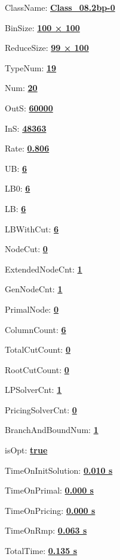 \documentclass[11pt]{article}
\begin{document}
\pagestyle{empty}


ClassName: \underline{\textbf{Class_08.2bp-0}}
\par
BinSize: \underline{\textbf{100 × 100}}
\par
ReduceSize: \underline{\textbf{99 × 100}}
\par
TypeNum: \underline{\textbf{19}}
\par
Num: \underline{\textbf{20}}
\par
OutS: \underline{\textbf{60000}}
\par
InS: \underline{\textbf{48363}}
\par
Rate: \underline{\textbf{0.806}}
\par
UB: \underline{\textbf{6}}
\par
LB0: \underline{\textbf{6}}
\par
LB: \underline{\textbf{6}}
\par
LBWithCut: \underline{\textbf{6}}
\par
NodeCut: \underline{\textbf{0}}
\par
ExtendedNodeCnt: \underline{\textbf{1}}
\par
GenNodeCnt: \underline{\textbf{1}}
\par
PrimalNode: \underline{\textbf{0}}
\par
ColumnCount: \underline{\textbf{6}}
\par
TotalCutCount: \underline{\textbf{0}}
\par
RootCutCount: \underline{\textbf{0}}
\par
LPSolverCnt: \underline{\textbf{1}}
\par
PricingSolverCnt: \underline{\textbf{0}}
\par
BranchAndBoundNum: \underline{\textbf{1}}
\par
isOpt: \underline{\textbf{true}}
\par
TimeOnInitSolution: \underline{\textbf{0.010 s}}
\par
TimeOnPrimal: \underline{\textbf{0.000 s}}
\par
TimeOnPricing: \underline{\textbf{0.000 s}}
\par
TimeOnRmp: \underline{\textbf{0.063 s}}
\par
TotalTime: \underline{\textbf{0.135 s}}
\par
\newpage


\end{document}
